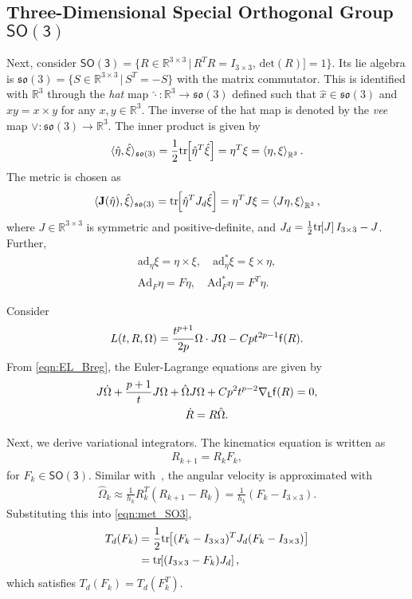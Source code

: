 \documentclass[letterpaper, 10pt, conference]{ieeeconf}
\newcommand{\bracket}[1]{\ensuremath{\left[ #1 \right]}}
\newcommand{\tr}[1]{\mbox{tr}\ensuremath{\negthickspace\bracket{#1}}}
\newcommand{\SO}{\ensuremath{\mathsf{SO(3)}}}
\renewcommand{\L}{\ensuremath{\mathsf{L}}}
\newcommand{\so}{\ensuremath{\mathfrak{so}(3)}}
\renewcommand{\Re}{\ensuremath{\mathbb{R}}}
\newcommand{\pair}[1]{\ensuremath{\left\langle #1 \right\rangle}}
\newcommand{\Ad}{\ensuremath{\mathrm{Ad}}}
\newcommand{\ad}{\ensuremath{\mathrm{ad}}}
\begin{document}
\subsection{Three-Dimensional Special Orthogonal Group $\SO$}

Next, consider $\SO=\{R\in\Re^{3\times 3}\,|\, R^T R = I_{3\times 3},\, \mathrm{det}(R)]=1\}$.
Its lie algebra is $\so=\{S\in\Re^{3\times 3}\,|\, S^T=-S\}$ with the matrix commutator. 
This is identified with $\Re^3$ through the \textit{hat} map $\hat\cdot :\Re^3\rightarrow\so$ defined such that $\hat x\in\so$ and $\hat x y = x\times y$ for any $x,y\in\Re^3$.
The inverse of the hat map is denoted by the \textit{vee} map $\vee: \so\rightarrow\Re^3$.
The inner product is given by
\begin{align*}
    \langle \hat \eta, \hat \xi \rangle_{\so} = \frac{1}{2}\tr{\hat \eta^T\hat \xi} = \eta^T\xi = \pair{\eta,\xi}_{\Re^3}.
\end{align*}
The metric is chosen as
\begin{align}
    \langle \mathbf{J}(\hat \eta), \hat \xi \rangle_{\so} = \tr{\hat \eta^T J_d \hat \xi} = \eta^TJ \xi = \pair{J\eta,\xi}_{\Re^3},\label{eqn:met_SO3}
\end{align}
where $J\in\Re^{3\times 3}$ is symmetric and positive-definite, and $J_d=\frac{1}{2}\tr{J}I_{3\times 3}-J$.
Further, 
\begin{align*}
    \ad_\eta\xi = \eta\times \xi, \quad \ad^*_\eta \xi = \xi\times \eta,\\
    \Ad_F\eta = F\eta, \quad \Ad^*_F \eta = F^T\eta.
\end{align*}

Consider
\begin{align*}
    L(t,R,\Omega) = \frac{t^{p+1}}{2p} \Omega\cdot J\Omega - Cpt^{2p-1} \mathsf{f}(R).
\end{align*}
From \eqref{eqn:EL_Breg}, the Euler-Lagrange equations are given by
\begin{gather}
    J\dot\Omega + \frac{p+1}{t} J\Omega + \hat\Omega J\Omega + C p^2 t^{p-2} \nabla_\L \obj(R) = 0,\label{eqn:EL_SO3}\\
    \dot R = R\hat\Omega.
\end{gather}

Next, we derive variational integrators. 
The kinematics equation is written as
\begin{align}
    R_{k+1} = R_k F_k,
\end{align}
for $F_k\in\SO$.
Similar with~\cite{LeeLeoCMAME07}, the angular velocity is approximated with
\begin{align*}
    \hat\Omega_k \approx \frac{1}{h_k} R_k^T (R_{k+1}-R_k) = \frac{1}{h_k} (F_k-I_{3\times 3}).
\end{align*}
Substituting this into \eqref{eqn:met_SO3},
\begin{align}
    T_d(F_k) & = \frac{1}{2}\tr{(F_k-I_{3\times 3})^T J_d(F_k-I_{3\times 3})}\nonumber \\
             & =\tr{(I_{3\times 3}-F_k)J_d}, \label{eqn:Td_SO3}
\end{align}
which satisfies $T_d(F_k)=T_d(F_k^T)$.
\end{document}
